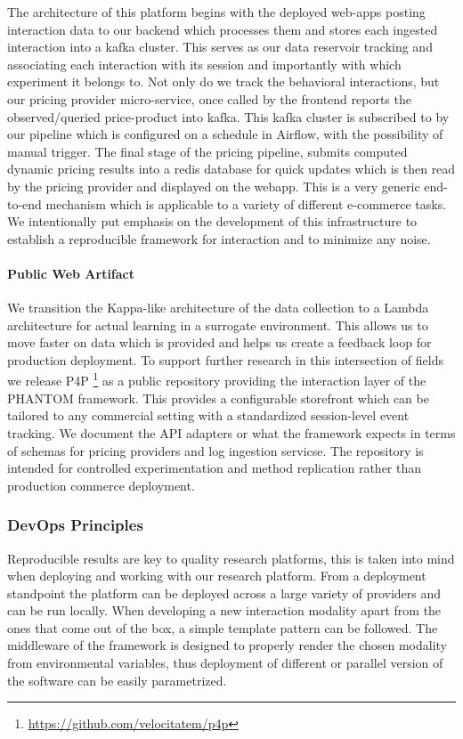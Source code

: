 The architecture of this platform begins with the deployed web-apps posting interaction data to our backend which processes them and stores each ingested interaction into a kafka cluster. This serves as our data reservoir tracking and associating each interaction with its session and importantly with which experiment it belongs to. Not only do we track the behavioral interactions, but our pricing provider micro-service, once called by the frontend reports the observed/queried price-product into kafka. This kafka cluster is subscribed to by our pipeline which is configured on a schedule in Airflow, with the possibility of manual trigger. The final stage of the pricing pipeline, submits computed dynamic pricing results into a redis database for quick updates which is then read by the pricing provider and displayed on the webapp. This is a very generic end-to-end mechanism which is applicable to a variety of different e-commerce tasks. We intentionally put emphasis on the development of this infrastructure to establish a reproducible framework for interaction and to minimize any noise.

\paragraph{Public Web Artifact} We transition the Kappa-like architecture of the data collection to a Lambda architecture for actual learning in a surrogate environment. This allows us to move faster on data which is provided and helps us create a feedback loop for production deployment. To support further research in this intersection of fields we release P4P \footnote{\url{https://github.com/velocitatem/p4p}} as a public repository providing the interaction layer of the PHANTOM framework. This provides a configurable storefront which can be tailored to any commercial setting with a standardized session-level event tracking. We document the API adapters or what the framework expects in terms of schemas for pricing providers and log ingestion servicse. The repository is intended for controlled experimentation and method replication rather than production commerce deployment.

\subsubsection{DevOps Principles}

Reproducible results are key to quality research platforms, this is taken into mind when deploying and working with our research platform. From a deployment standpoint the platform can be deployed across a large variety of providers and can be run locally. When developing a new interaction modality apart from the ones that come out of the box, a simple template pattern can be followed. The middleware of the framework is designed to properly render the chosen modality from environmental variables, thus deployment of different or parallel version of the software can be easily parametrized.

